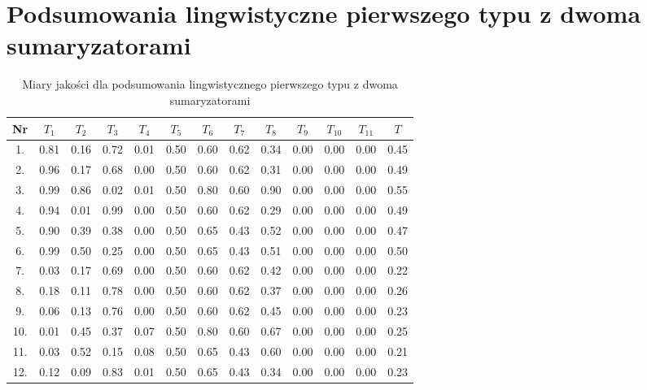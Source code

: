 \documentclass{article}
\begin{document}
    \section{Podsumowania lingwistyczne pierwszego typu z dwoma sumaryzatorami}
    \begin{table}[h!]
    \centering
    \begin{tabular}{|c|c|c|c|c|c|c|c|c|c|c|c|c|}
    \hline
    \textbf{Nr} & \textbf{\(T_1\)} &\textbf{\(T_2\)} & \textbf{\(T_3\)} & \textbf{\(T_4\)} & \textbf{\(T_5\)} & \textbf{\(T_6\)} & \textbf{\(T_7\)} & \textbf{\(T_8\)} & \textbf{\(T_9\)} & \textbf{\(T_{10}\)} & \textbf{\(T_{11}\)} & \textbf{\(T\)}\\
    \hline
    1. & 0.81 & 0.16 & 0.72 & 0.01 & 0.50 & 0.60 & 0.62 & 0.34 & 0.00 & 0.00 & 0.00 & 0.45 \\ \hline
    2. & 0.96 & 0.17 & 0.68 & 0.00 & 0.50 & 0.60 & 0.62 & 0.31 & 0.00 & 0.00 & 0.00 & 0.49 \\ 
    \hline
    3. & 0.99 & 0.86 & 0.02 & 0.01 & 0.50 & 0.80 & 0.60 & 0.90 & 0.00 & 0.00 & 0.00 & 0.55 \\
    \hline
    4. & 0.94 & 0.01 & 0.99 & 0.00 & 0.50 & 0.60 & 0.62 & 0.29 & 0.00 & 0.00 & 0.00 & 0.49 \\
    \hline
    5. & 0.90 & 0.39 & 0.38 & 0.00 & 0.50 & 0.65 & 0.43 & 0.52 & 0.00 & 0.00 & 0.00 & 0.47 \\
    \hline
    6. & 0.99 & 0.50 & 0.25 & 0.00 & 0.50 & 0.65 & 0.43 & 0.51 & 0.00 & 0.00 & 0.00 & 0.50 \\ \hline
    7. & 0.03 & 0.17 & 0.69 & 0.00 & 0.50 & 0.60 & 0.62 & 0.42 & 0.00 & 0.00 & 0.00 & 0.22 \\ \hline
    8. & 0.18 & 0.11 & 0.78 & 0.00 & 0.50 & 0.60 & 0.62 & 0.37 & 0.00 & 0.00 & 0.00 & 0.26 \\ \hline
    9. & 0.06 & 0.13 & 0.76 & 0.00 & 0.50 & 0.60 & 0.62 & 0.45 & 0.00 & 0.00 & 0.00 & 0.23 \\ \hline
    10. & 0.01 & 0.45 & 0.37 & 0.07 & 0.50 & 0.80 & 0.60 & 0.67 & 0.00 & 0.00 & 0.00 & 0.25 \\ \hline
    11. & 0.03 & 0.52 & 0.15 & 0.08 & 0.50 & 0.65 & 0.43 & 0.60 & 0.00 & 0.00 & 0.00 & 0.21 \\ \hline
    12. & 0.12 & 0.09 & 0.83 & 0.01 & 0.50 & 0.65 & 0.43 & 0.34 & 0.00 & 0.00 & 0.00 & 0.23 \\ \hline
    \end{tabular}
    \caption{Miary jakości dla podsumowania lingwistycznego pierwszego typu z dwoma sumaryzatorami}
    \end{table}
\end{document}
